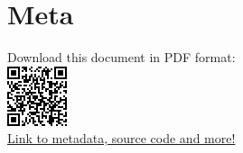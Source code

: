 \section{Meta}
\vfill
\begin{centering}
Download this document in PDF format:
\\[2mm]
\includegraphics{qrcode}
\\[2mm]
\href{http://paconet.org/wiki/index.php?title=QRTest}{Link to metadata, source code and more!}

\end{centering}

